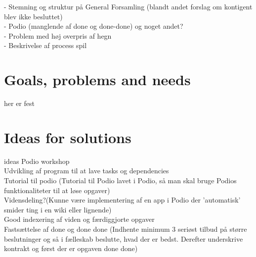 - Stemning og struktur på General Forsamling (blandt andet forslag om kontigent blev ikke besluttet)\\
- Podio (manglende af done og done-done) og noget andet?\\
- Problem med høj overpris af hegn\\
- Beskrivelse af process spil

\section{Goals, problems and needs}

her er fest
\section{Ideas for solutions}{ideas}
Podio workshop\\
Udvikling af program til at lave tasks og dependencies\\
Tutorial til podio (Tutorial til Podio lavet i Podio, så man skal bruge Podios funktionaliteter til at løse opgaver)\\
Vidensdeling?(Kunne være implementering af en app i Podio der 'automatisk' smider ting i en wiki eller lignende)\\
Good indexering af viden og færdiggjorte opgaver\\
Fastsættelse af done og done done (Indhente minimum 3 seriøst tilbud på større beslutninger og så i fælleskab beslutte, hvad der er bedst. Derefter underskrive kontrakt
og først der er opgaven done done)


